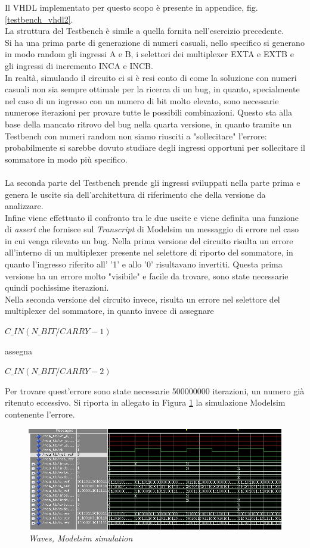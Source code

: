 Il VHDL implementato per questo scopo è presente in appendice, fig. \ref{testbench_vhdl2}.\\
La struttura del Testbench è simile a quella fornita nell'esercizio precedente.\\
Si ha una prima parte di generazione di numeri casuali, nello specifico si generano in modo random gli ingressi A e B, i selettori dei multiplexer EXTA e EXTB e gli ingressi di incremento INCA e INCB.\\
In realtà, simulando il circuito ci si è resi conto di come la soluzione con numeri casuali non sia sempre ottimale per la ricerca di un bug, in quanto, specialmente nel caso di un ingresso con un numero di bit molto elevato, sono necessarie numerose iterazioni per provare tutte le possibili combinazioni. Questo sta alla base della mancato ritrovo del bug nella quarta versione, in quanto tramite un Testbench con numeri random non siamo riusciti a "sollecitare" l'errore: probabilmente si sarebbe dovuto studiare degli ingressi opportuni per sollecitare il sommatore in modo più specifico.\\
\\
La seconda parte del Testbench prende gli ingressi sviluppati nella parte prima e genera le uscite sia dell'architettura di riferimento che della versione da analizzare.\\
Infine viene effettuato il confronto tra le due uscite e viene definita una funzione di \textit{assert} che fornisce sul \textit{Transcript} di Modelsim un messaggio di errore nel caso in cui venga rilevato un bug.
Nella prima versione del circuito risulta un errore all'interno di un multiplexer presente nel selettore di riporto del sommatore, in quanto l'ingresso riferito all' '1' e allo '0' risultavano invertiti. Questa prima versione ha un errore molto "visibile" e facile da trovare, sono state necessarie quindi pochissime iterazioni.\\
Nella seconda versione del circuito invece, risulta un errore nel selettore del multiplexer del sommatore, in quanto invece di assegnare
\begin{center}
	$C\_IN(N\_BIT/CARRY-1)$
\end{center} 
assegna 
\begin{center}
	$C\_IN(N\_BIT/CARRY-2)$
\end{center}
Per trovare quest'errore sono state necessarie 500000000 iterazioni, un numero già ritenuto eccessivo. Si riporta in allegato in Figura \ref{sim1} la simulazione Modelsim contenente l'errore.
\begin{figure}[!htb]
	\centering
	\includegraphics[scale=0.6]{immagini/sim1}
	\caption{\textit{Waves, Modelsim simulation}}
	\label{sim1}
\end{figure}
